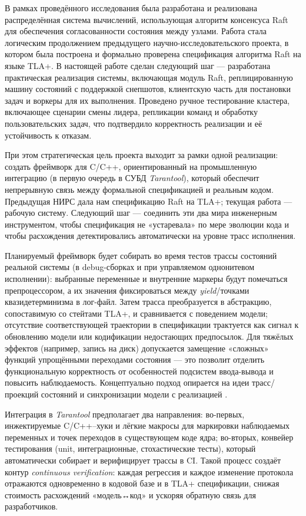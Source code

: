 \conclusion

В рамках проведённого исследования была разработана и реализована
распределённая система вычислений, использующая алгоритм консенсуса Raft для
обеспечения согласованности состояния между узлами. Работа стала логическим
продолжением предыдущего научно-исследовательского проекта, в котором была
построена и формально проверена спецификация алгоритма Raft на языке TLA+. В
настоящей работе сделан следующий шаг — разработана практическая реализация
системы, включающая модуль Raft, реплицированную машину состояний с поддержкой
снепшотов, клиентскую часть для постановки задач и воркеры для их выполнения.
Проведено ручное тестирование кластера, включающее сценарии смены лидера,
репликации команд и обработку пользовательских задач, что подтвердило
корректность реализации и её устойчивость к отказам.

При этом стратегическая цель проекта выходит за рамки одной реализации: создать
фреймворк для C/C++, ориентированный на промышленную интеграцию (в первую
очередь в СУБД \textit{Tarantool}), который обеспечит непрерывную связь между
формальной спецификацией и реальным кодом. Предыдущая НИРС дала нам
спецификацию Raft на TLA+; текущая работа — рабочую систему. Следующий шаг —
соединить эти два мира инженерным инструментом, чтобы спецификация не
«устаревала» по мере эволюции кода и чтобы расхождения детектировались
автоматически на уровне трасс исполнения.

Планируемый фреймворк будет собирать во время тестов трассы состояний реальной
системы (в debug-сборках и при управляемом однонитевом исполнении): выбранные
переменные и внутренние маркеры будут помечаться препроцессором, а их значения
фиксироваться между \emph{yield}/точками квазидетерминизма в лог-файл. Затем
трасса преобразуется в абстракцию, сопоставимую со стейтами TLA+, и
сравнивается с поведением модели; отсутствие соответствующей траектории в
спецификации трактуется как сигнал к обновлению модели или кодификации
недостающих предпосылок. Для тяжёлых эффектов (например, запись на диск)
допускается замещение «сложных» функций упрощёнными переходами состояния — это
позволит отделить функциональную корректность от особенностей подсистем
ввода-вывода и повысить наблюдаемость. Концептуально подход опирается на идеи
трасс/проекций состояний и синхронизации модели с реализацией
\cite{trace_pn,tlacoverage,merz2024}.

Интеграция в \textit{Tarantool} предполагает два направления: во-первых,
инжектируемые C/C++–хуки и лёгкие макросы для маркировки наблюдаемых переменных
и точек переходов в существующем коде ядра; во-вторых, конвейер тестирования
(unit, интеграционные, стохастические тесты), который автоматически собирает и
верифицирует трассы в CI. Такой процесс создаёт контур \emph{continuous
verification}: каждая регрессия и каждое изменение протокола отражаются
одновременно в кодовой базе и в TLA+ спецификации, снижая стоимость расхождений
«модель↔код» и ускоряя обратную связь для разработчиков.

